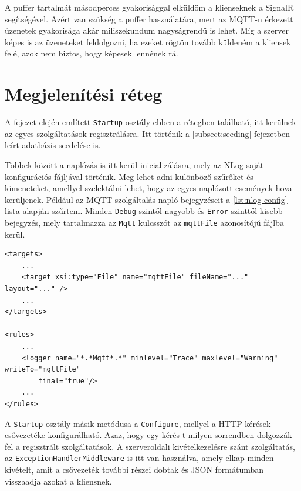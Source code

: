 A puffer tartalmát másodperces gyakorisággal elküldöm a klienseknek a SignalR segítségével. 
Azért van szükség a puffer használatára, mert az MQTT-n érkezett üzenetek gyakorisága akár miliszekundum nagyságrendű is lehet. 
Míg a szerver képes is az üzeneteket feldolgozni, ha ezeket rögtön tovább küldeném a kliensek felé, azok nem biztos, hogy képesek lennének rá.

\section{Megjelenítési réteg}
A fejezet elején említett \verb+Startup+ osztály ebben a rétegben található, itt kerülnek az egyes szolgáltatások regisztrálásra.
Itt történik a \ref{subsect:seeding} fejezetben leírt adatbázis seedelése is.

Többek között a naplózás is itt kerül inicializálásra, mely az NLog saját konfigurációs fájljával történik.
Meg lehet adni különböző szűrőket és kimeneteket, amellyel szelektálni lehet, hogy az egyes naplózott események hova kerüljenek.
Például az MQTT szolgáltalás napló bejegyzéseit a \ref{lst:nlog-config} lista alapján szűrtem.
Minden \verb+Debug+ szintől nagyobb és \verb+Error+ szinttől kisebb bejegyzés, mely tartalmazza az \verb+Mqtt+ kulcsszót az \verb+mqttFile+ azonosítójú fájlba kerül.

\begin{lstlisting}[style=xml, caption=Az NLog.config fájl egy részlete, label=lst:nlog-config]
<targets>
    ...
    <target xsi:type="File" name="mqttFile" fileName="..." layout="..." />
    ...
</targets>

<rules>
    ...
    <logger name="*.*Mqtt*.*" minlevel="Trace" maxlevel="Warning" writeTo="mqttFile" 
        final="true"/>
    ...
</rules>
\end{lstlisting}

A \verb+Startup+ osztály másik metódusa a \verb+Configure+, mellyel a HTTP kérések csővezetéke konfigurálható.
Azaz, hogy egy kérés-t milyen sorrendben dolgozzák fel a regisztrált szolgáltatások.
A szerveroldali kivételkezelésre szánt szolgáltatás, az \verb+ExceptionHandlerMiddleware+ is itt van használva, 
amely elkap minden kivételt, amit a csővezeték további részei dobtak és JSON formátumban visszaadja azokat a kliensnek.

